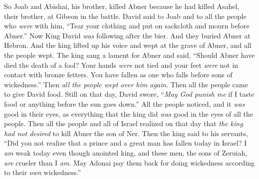 \begin{biblechapter}
\verse So Joab and Abishai, his brother, killed Abner because he had killed Asahel, their brother, at Gibeon in the battle.
\verse David said to Joab and to all the people who \textit{were} with him, “Tear your clothing and put on sackcloth and mourn before Abner.” Now King David \textit{was} following after the bier.
\verse And they buried Abner at Hebron. And the king lifted up his voice and wept at the grave of Abner, and all the people wept.
\verse The king sang a lament for Abner and said, “Should Abner have died the death of a fool?
\verse Your hands \textit{were} not tied and your feet \textit{were} not in contact with bronze fetters. You have fallen as one who falls before sons of wickedness.” Then \textit{all the people wept over him again}.
\verse Then all the people came to give David food. Still on that day, David swore, “\textit{May God punish me} if I taste food or anything before the sun goes down.”
\verse All the people noticed, and it \textit{was} good in their eyes, as everything that the king did \textit{was} good in the eyes of all the people.
\verse Then all the people and all of Israel realized on that day that \textit{the king had not desired} to kill Abner the son of Ner.
\verse Then the king said to his servants, “Did you not realize that a prince and a great man has fallen today in Israel?
\verse I \textit{am} weak today even though anointed king, and these men, the sons of Zeruiah, \textit{are} crueler than I \textit{am}. May Adonai pay them back for doing wickedness according to their \textit{own} wickedness.”
\end{biblechapter}

